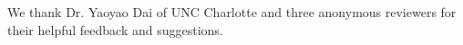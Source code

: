 \documentclass[11pt,a4paper]{article}
\begin{document}
We thank Dr. Yaoyao Dai of UNC Charlotte and three anonymous reviewers for their helpful feedback and suggestions.




\end{document}
